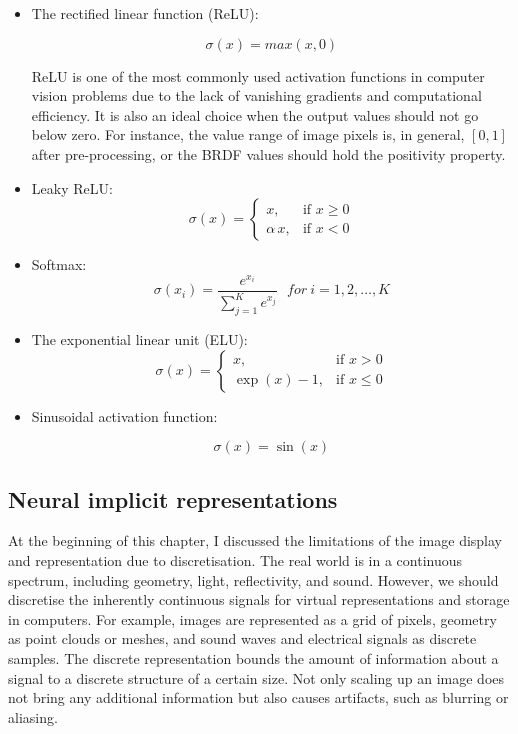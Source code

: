 \begin{itemize}
\item The rectified linear function (\gls{ReLU}):

\begin{equation}
\sigma(x) = max(x, 0)
\end{equation}

\gls{ReLU} is one of the most commonly used activation functions in computer vision problems due to the lack of vanishing gradients and computational efficiency. It is also an ideal choice when the output values should not go below zero. For instance, the value range of image pixels is, in general, $[0, 1]$ after pre-processing, or the \gls{BRDF} values should hold the positivity property.

\item Leaky ReLU:
\begin{equation}
 \sigma(x) = \begin{cases}
x, & \text{if $x\geq0$}\\
\alpha \, x,  & \text{if $x<0$} 
  \end{cases}
\end{equation}


\item Softmax:
\begin{equation}
\sigma(x_i) = \frac{e^{x_{i}}}{\sum_{j=1}^K e^{x_{j}}} \ \ \ for\ i=1,2,\dots,K
\end{equation}

\item The exponential linear unit (\gls{ELU}):
\begin{equation}
 \sigma(x) = \begin{cases}
x, & \text{if $x>0$}\\
\exp(x) - 1,  & \text{if $x\leq0$} 
  \end{cases}
\end{equation}

\item Sinusoidal activation function:

\begin{equation}
\sigma(x) = \sin(x)
\label{eq:sine-act}
\end{equation}
\end{itemize}

\subsection{Neural implicit representations}

At the beginning of this chapter, I discussed the limitations of the image display and representation due to discretisation. The real world is in a continuous spectrum, including geometry, light, reflectivity, and sound. However, we should discretise the inherently continuous signals for virtual representations and storage in computers. For example, images are represented as a grid of pixels, geometry as point clouds or meshes, and sound waves and electrical signals as discrete samples. The discrete representation bounds the amount of information about a signal to a discrete structure of a certain size. Not only scaling up an image does not bring any additional information but also causes artifacts, such as blurring or aliasing. 

